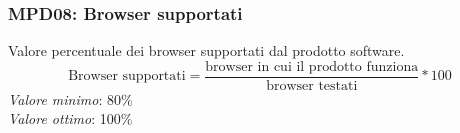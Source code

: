 \subsubsection{MPD08: Browser supportati}
Valore percentuale dei browser supportati dal prodotto software.\\
\begin{equation*}
\text{Browser supportati}=\frac{\text{browser in cui il prodotto funziona}}{\text{browser testati}}*100
\end{equation*}	
\textit{Valore minimo}: 80\%\\
\textit{Valore ottimo}: 100\%\\